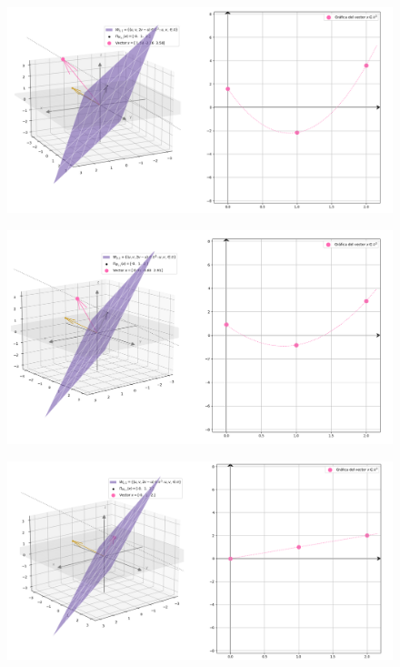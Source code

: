 \documentclass[]{beamer}
\theoremstyle{definition}
\begin{document}
\begin{frame}
\begin{figure}[h]
\includegraphics[scale = 0.3]{6Dic_0}
\end{figure}
\end{frame}

\begin{frame}
\begin{figure}[h]
\includegraphics[scale = 0.3]{6Dic_1}
\end{figure}
\end{frame}

\begin{frame}
\begin{figure}[h]
\includegraphics[scale = 0.3]{6Dic_2}
\end{figure}
\end{frame}
\end{document}
